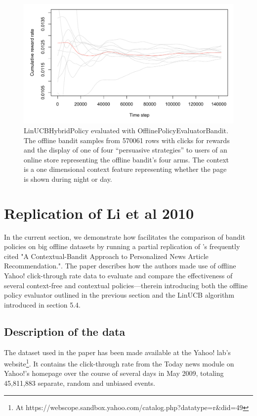 \documentclass{jss}
\begin{document}
\begin{figure}[H]
  \centering
    \includegraphics[width=.99\textwidth]{fig/offline_bandit}

      \caption{LinUCBHybridPolicy evaluated with OfflinePolicyEvaluatorBandit. The offline bandit samples from 570061 rows with clicks for rewards and the display of one of four “persuasive strategies” to users of an online store representing the offline bandit's four arms. The context is a one dimensional context feature representing whether the page is shown during night or day. }
      \label{fig:offline_bandit}
\end{figure}

\section{Replication of Li et al 2010} \label{repl}

In the current section, we demonstrate how  facilitates the comparison of bandit policies on big offline datasets by running a partial replication of \cite{Li2010}'s frequently cited "A Contextual-Bandit Approach to Personalized News Article Recommendation.". The paper describes how the authors made use of offline Yahoo! click-through rate data to evaluate and compare the effectiveness of several context-free and contextual policies---therein introducing both the offline policy evaluator outlined in the previous section and the LinUCB algorithm introduced in section 5.4.

\subsection{Description of the data} \label{datadesc}

The dataset used in the \cite{Li2010} paper has been made available at the Yahoo! lab's website\footnote{At https://webscope.sandbox.yahoo.com/catalog.php?datatype=r\&did=49}. It contains the click-through rate from the Today news module on Yahoo!'s homepage over the course of several days in May 2009, totaling 45,811,883 separate, random and unbiased events.
\end{document}
